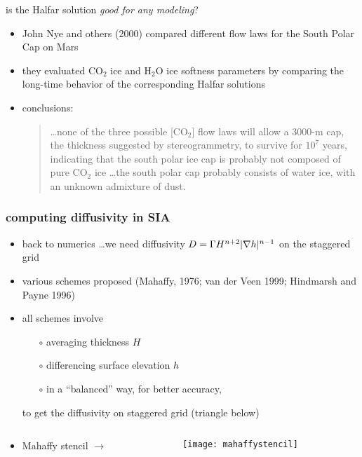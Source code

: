 \begin{frame}{is the Halfar solution \emph{good for any modeling}?}

\begin{itemize}
\item John Nye and others (2000) compared different flow laws for the South Polar Cap on Mars
\item they evaluated $\text{CO}_2$ ice and $\text{H}_2\text{O}$ ice softness parameters by comparing the long-time behavior of the corresponding Halfar solutions
\item conclusions:
  \begin{quote}
  \dots none of the three possible [$\text{CO}_2$] flow laws will allow a 3000-m cap, the thickness suggested by stereogrammetry, to survive for $10^7$ years, indicating that the south polar ice cap is probably not composed of pure $\text{CO}_2$ ice \dots the south polar cap probably consists of water ice, with an unknown admixture of dust.
  \end{quote}
\end{itemize}

\end{frame}


\begin{frame}
  \frametitle{computing diffusivity in SIA}

\begin{itemize}
\item back to numerics \dots we need diffusivity $D = \Gamma H^{n+2} |\nabla h|^{n-1}$ on the staggered grid
\item various schemes proposed \small (Mahaffy, 1976; van der Veen 1999; Hindmarsh and Payne 1996)
\item all schemes involve
  \begin{itemize}
  \item[$\circ$] averaging thickness $H$
  \item[$\circ$] differencing surface elevation $h$
  \item[$\circ$] in a ``balanced'' way, for better accuracy,
  \end{itemize}
to get the diffusivity on staggered grid (triangle below)
\end{itemize}

\begin{columns}
\begin{column}{0.65\textwidth}
\begin{itemize}
\item Mahaffy stencil \large $\to$ \normalsize
\end{itemize}
\end{column}

\begin{column}{0.35\textwidth}
  \texttt{[image: mahaffystencil]}
\end{column}
\end{columns}
\end{frame}


